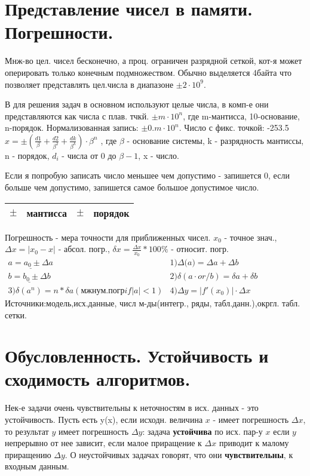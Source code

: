 \documentclass{article}
\begin{document}
\section{Представление чисел в памяти. Погрешности.}
Мнж-во цел. чисел бесконечно, а проц. ограничен разрядной сеткой, кот-я
может оперировать только конечным подмножеством.
Обычно выделяется 4байта что позволяет представлять цел.числа в диапазоне $\pm 2
\cdot 10^9$.

В для решения задач в основном используют целые числа, в комп-е они
представляются как числа с плав. тчкй.
$\pm m \cdot 10^n$, где m-мантисса, 10-основание, n-порядок.
Нормализованная запись: $\pm 0.m \cdot 10^n$.
Число с фикс. точкой: -253.5
$x=\pm(\frac{d1}{\beta} + \frac{d2}{\beta^2} + \frac{dk}{\beta^k})\cdot \beta^n$
, где $\beta$ - основание системы, k - разрядность мантиссы, n - порядок, $d_i$
- числа от 0 до $\beta-1$, x - число.

Если я попробую записать число меньшее чем допустимо - запишется 0, если больше
чем допустимо, запишется самое большое допустимое число.

 \begin{table}[h!]
  \begin{tabular}{|l|l|l|l|}
  \hline
  \bfseries $\pm$ & мантисса & $\pm$ & порядок \\
  \hline
  \end{tabular}
\end{table}
Погрешность - мера точности для приближенных чисел. $x_0$ - точное знач., 
$\Delta x = |x_0 - x |$ - абсол. погр., $\delta x = \frac{\Delta x}{x_0}*100\%$
- относит. погр.\\
\begin{math}
\begin{array}{rl}
  \underline{a=a_0 \pm \Delta a} & 1) \Delta(a\pmb)= \Delta a + \Delta b\\
  \underline{b=b_0 \pm \Delta b} & 2) \delta(a \cdot or / b) = \delta a + \delta b \\
  3) \delta(a^n) = n*\delta a (мжн ум. погр if |a|<1) & 4) \Delta y = |f'(x_0)|\cdot \Delta x
\end{array}
\end{math}
Источники:модель,исх.данные, числ м-ды(интегр., ряды, табл.данн.),окргл. табл.
сетки.

\section{Обусловленность. Устойчивость и сходимость алгоритмов.}
Нек-е задачи очень чувствительны к неточностям в исх. данных - это устойчивость.
Пусть есть y(x), если исходн. величина $x$ - имеет погрешность $\Delta x$, то
результат $y$ имеет погрешность $\Delta y$: задача \textbf{устойчива} по
исх. пар-у $x$ если $y$ непрерывно от нее зависит, если малое приращение к
$\Delta x$ приводит к малому приращению $\Delta y$. О неустойчивых задачах
говорят, что они \textbf{чувствительны}, к входным данным.
\end{document}
